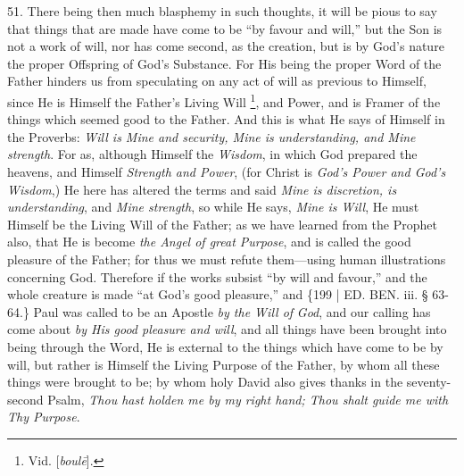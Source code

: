 51. There being then much
blasphemy in such thoughts, it will be pious to say that things that
are made have come to be ``by favour and will,'' but the Son is not a
work of will, nor has come second, as the creation, but is by God's
nature the proper Offspring of God's Substance. For His being the
proper Word of the Father hinders us from speculating on any act of
will as previous to Himself, since He is Himself the Father's Living
Will \footnote{Vid. [\emph{boul\={e}}].}, and Power, and is
Framer of the things which seemed good to the Father. And this is what
He says of Himself in the Proverbs: \emph{Will is Mine and security, Mine
is understanding, and Mine strength}. For as, although Himself the \emph{Wisdom},
in which God prepared the heavens, and Himself \emph{Strength and Power},
(for Christ is \emph{God's Power and God's Wisdom},) He here has
altered the terms and said \emph{Mine is discretion, is understanding},
and \emph{Mine strength}, so while He says, \emph{Mine is Will}, He
must Himself be the Living Will of the Father; as we have learned from
the Prophet also, that He is become \emph{the Angel of great Purpose},
and is called the good pleasure of the Father; for thus we must refute
them—using human illustrations concerning God. Therefore if the
works subsist ``by will and favour,'' and the whole creature is made ``at
God's good pleasure,'' and \{199 | ED.
BEN.
iii. § 63-64.\} Paul was called to be an Apostle \emph{by the Will of}
\emph{God}, and our calling has come about \emph{by His good pleasure and
will}, and all things have been brought into being through the
Word, He is external to the things which have come to be by will, but
rather is Himself the Living Purpose of the Father, by whom all these
things were brought to be; by whom holy David also gives thanks in the
seventy-second Psalm, \emph{Thou hast holden me by my right hand; Thou
shalt guide me with Thy Purpose}.

